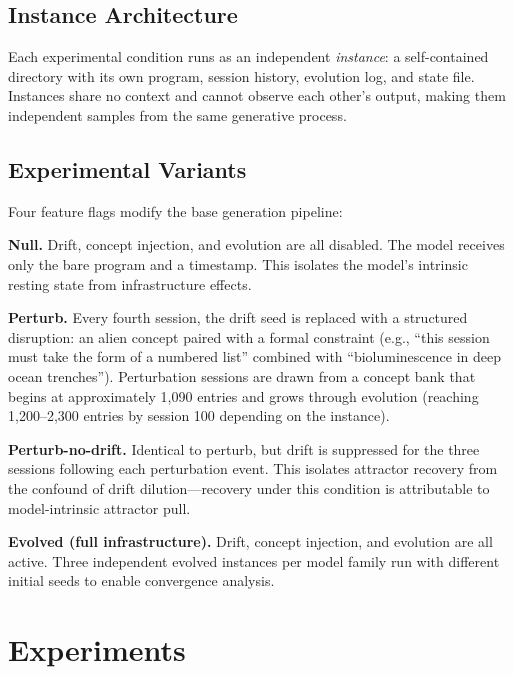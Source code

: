 \documentclass{article}
\begin{document}
\subsection{Instance Architecture}

Each experimental condition runs as an independent \emph{instance}: a
self-contained directory with its own program, session history, evolution log,
and state file. Instances share no context and cannot observe each other's
output, making them independent samples from the same generative process.

\subsection{Experimental Variants}
\label{sec:variants}

Four feature flags modify the base generation pipeline:

\textbf{Null.} Drift, concept injection, and evolution are all disabled. The
model receives only the bare program and a timestamp. This isolates the model's
intrinsic resting state from infrastructure effects.

\textbf{Perturb.} Every fourth session, the drift seed is replaced with a
structured disruption: an alien concept paired with a formal constraint (e.g.,
``this session must take the form of a numbered list'' combined with
``bioluminescence in deep ocean trenches''). Perturbation sessions are drawn
from a concept bank that begins at approximately 1{,}090 entries and grows through evolution (reaching 1{,}200--2{,}300 entries by session 100 depending on the instance).

\textbf{Perturb-no-drift.} Identical to perturb, but drift is suppressed for
the three sessions following each perturbation event. This isolates attractor
recovery from the confound of drift dilution---recovery under this condition is
attributable to model-intrinsic attractor pull.

\textbf{Evolved (full infrastructure).} Drift, concept injection, and evolution
are all active. Three independent evolved instances per model family run with
different initial seeds to enable convergence analysis.

\section{Experiments}
\label{sec:experiments}
\end{document}
